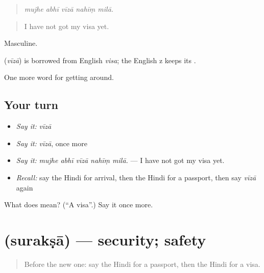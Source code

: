 \begin{quote}
\emph{mujhe abhī vīzā nahīṃ milā.}
\end{quote}

\begin{quote}
I have not got my visa yet.
\end{quote}

Masculine.

\begin{cousinweb}
\textbf{} (\emph{vīzā}) is borrowed from English \emph{visa}; the English z keeps its .
\end{cousinweb}

\begin{grammarlens}[title={What you've built}]
One more word for getting around.
\end{grammarlens}

\subsection*{Your turn}
\begin{itemize}
\raggedright
  \item \emph{Say it:} \emph{vīzā}
  \item \emph{Say it:} \emph{vīzā}, once more
  \item \emph{Say it:} \emph{mujhe abhī vīzā nahīṃ milā.} — I have not got my visa yet.
  \item \emph{Recall:} say the Hindi for arrival, then the Hindi for a passport, then say \emph{vīzā} again
\end{itemize}

\begin{tcolorbox}[breakable,colback=teal!4,colframe=teal!35!black,title={Before you move on}]
What does  mean? (\textquotedblleft{}A visa\textquotedblright{}.) Say it once more.
\end{tcolorbox}
\section[\texorpdfstring{\hi{सुरक्षा} (surakṣā)}{सुरक्षा (surakṣā)}]{ (surakṣā) — security; safety}

\label{lesson:HI-C410-suraksa}



\begin{quote}
Before the new one: say the Hindi for a passport, then the Hindi for a visa.
\end{quote}


